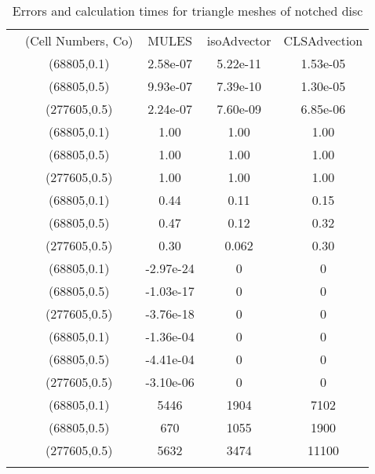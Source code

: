 \begin{table}
\centering
\caption{Errors and calculation times for triangle meshes of notched disc}
\label{Tab:03}
\begin{tabular}{ccccc}
\hline\noalign{\smallskip}
\quad &(Cell Numbers, Co) & MULES &isoAdvector &CLSAdvection  \\
\noalign{\smallskip}\hline\noalign{\smallskip}
\multirow{5}{*}{$\varepsilon_{V}$}
&(68805,0.1)& 2.58e-07 &5.22e-11 &1.53e-05  \\
&(68805,0.5) & 9.93e-07 &7.39e-10 &1.30e-05\\
&(277605,0.5)& 2.24e-07 &7.60e-09 &6.85e-06\\
\hline\noalign{\smallskip}
\multirow{5}{*}{$\varepsilon_{M}$}
&(68805,0.1)& 1.00 &1.00 &1.00  \\
&(68805,0.5) & 1.00 &1.00 &1.00\\
&(277605,0.5)& 1.00 &1.00 &1.00\\
\hline\noalign{\smallskip}
\multirow{5}{*}{$\varepsilon_{S}$}
&(68805,0.1)& 0.44 &0.11 &0.15  \\
&(68805,0.5) & 0.47 &0.12 &0.32\\
&(277605,0.5)& 0.30 &0.062 &0.30\\
\hline\noalign{\smallskip}
\multirow{5}{*}{$\min(\alpha)$}
&(68805,0.1)& -2.97e-24 &0 &0  \\
&(68805,0.5) & -1.03e-17 &0 &0\\
&(277605,0.5)& -3.76e-18 &0 &0\\
\hline\noalign{\smallskip}
\multirow{5}{*}{$\max(\alpha)-1$}
&(68805,0.1)& -1.36e-04 &0 &0  \\
&(68805,0.5) & -4.41e-04 &0 &0\\
&(277605,0.5)& -3.10e-06 &0 &0\\
\hline\noalign{\smallskip}
\multirow{5}{*}{$T_{calc}$}
&(68805,0.1)& 5446 &1904 &7102  \\
&(68805,0.5) & 670 &1055 &1900\\
&(277605,0.5)& 5632 &3474 &11100\\
\noalign{\smallskip}\hline
\end{tabular}
\end{table}
